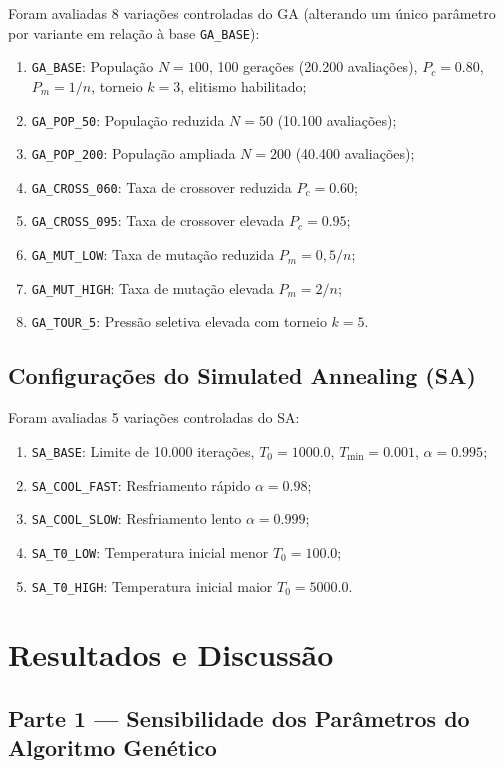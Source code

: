 \documentclass[12pt]{article}
\begin{document}
Foram avaliadas 8 variações controladas do GA (alterando um único parâmetro por variante em relação à base \texttt{GA\_BASE}):
\begin{enumerate}
    \item \texttt{GA\_BASE}: População $N=100$, 100 gerações (20.200 avaliações), $P_c=0.80$, $P_m=1/n$, torneio $k=3$, elitismo habilitado;
    \item \texttt{GA\_POP\_50}: População reduzida $N=50$ (10.100 avaliações);
    \item \texttt{GA\_POP\_200}: População ampliada $N=200$ (40.400 avaliações);
    \item \texttt{GA\_CROSS\_060}: Taxa de crossover reduzida $P_c=0.60$;
    \item \texttt{GA\_CROSS\_095}: Taxa de crossover elevada $P_c=0.95$;
    \item \texttt{GA\_MUT\_LOW}: Taxa de mutação reduzida $P_m=0,5/n$;
    \item \texttt{GA\_MUT\_HIGH}: Taxa de mutação elevada $P_m=2/n$;
    \item \texttt{GA\_TOUR\_5}: Pressão seletiva elevada com torneio $k=5$.
\end{enumerate}

\subsection{Configurações do Simulated Annealing (SA)}

Foram avaliadas 5 variações controladas do SA:
\begin{enumerate}
    \item \texttt{SA\_BASE}: Limite de 10.000 iterações, $T_0=1000.0$, $T_{\min}=0.001$, $\alpha=0.995$;
    \item \texttt{SA\_COOL\_FAST}: Resfriamento rápido $\alpha=0.98$;
    \item \texttt{SA\_COOL\_SLOW}: Resfriamento lento $\alpha=0.999$;
    \item \texttt{SA\_T0\_LOW}: Temperatura inicial menor $T_0=100.0$;
    \item \texttt{SA\_T0\_HIGH}: Temperatura inicial maior $T_0=5000.0$.
\end{enumerate}

\section{Resultados e Discussão}

\subsection{Parte 1 — Sensibilidade dos Parâmetros do Algoritmo Genético}
\end{document}
